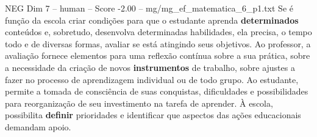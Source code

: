 \begin{textsample}{NEG Dim 7 – human – Score -2.00 – mg/mg\_ef\_matematica\_6\_p1.txt}  \label{ex:f7_neg_009}
Se é função da escola criar condições para que o estudante aprenda \textbf{determinados} conteúdos e, sobretudo, desenvolva determinadas habilidades, ela precisa, o tempo todo e de diversas formas, avaliar se está atingindo seus objetivos.
Ao professor, a avaliação fornece elementos para uma reflexão contínua sobre a sua prática, sobre a necessidade da criação de novos \textbf{instrumentos} de trabalho, sobre ajustes a fazer no processo de aprendizagem individual ou de todo grupo.
Ao estudante, permite a tomada de consciência de suas conquistas, dificuldades e possibilidades para reorganização de seu investimento na tarefa de aprender. À escola, possibilita \textbf{definir} prioridades e identificar que aspectos das ações educacionais demandam apoio.

\end{textsample}
